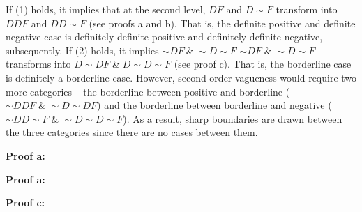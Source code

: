 If (1) holds, it implies that at the second level, $DF$ and
$D{\sim}F$ transform into $DDF$ and $DD{\sim}F$ (see proofs a and
b). That is, the definite positive and definite negative case is
definitely definite positive and definitely definite negative,
subsequently. If (2) holds, it implies \(\sim DF\ \&\ \sim D\sim F\)
${\sim}DF \; \& \; {\sim}D{\sim}F$ transforms into $D{\sim}DF \; \& \; D{\sim}D{\sim}F$ (see proof c). That is,
the borderline case is definitely a borderline case. However,
second-order vagueness would require two more categories -- the
borderline between positive and borderline
(${\sim}DDF \; \& \; {\sim}D{\sim}DF$) and the borderline between borderline
and negative (${\sim}DD\sim F \; \& \; {\sim}D{\sim}D{\sim}F$). As a result,
sharp boundaries are drawn between the three categories since there are
no cases between them.


\bigskip
\noindent
\begin{minipage}[t]{0.48\textwidth}
  \noindent \textbf{Proof a:} \\
  \begin{center}
    \end{center}
\end{minipage}
\begin{minipage}[t]{0.48\textwidth}
  \noindent \textbf{Proof a:} \\
  \begin{center}
    \end{center}
  \end{minipage}
\bigskip

\noindent \textbf{Proof c:}
\begin{center}
  \end{center}


